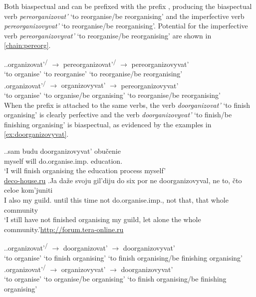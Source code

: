 Both biaspectual and  can be prefixed with the  prefix , producing the biaspectual verb \textit{pereorganizovat'} `to reorganise/be reorganising' and the imperfective verb \textit{pereorganizovyvat'} `to reorganise/be reorganising'. Potential  for the imperfective verb \textit{pereorganizovyvat'} `to reorganise/be reorganising' are shown in \ref{chain:pereorg}. 

\ex.\label{chain:pereorg}\ag.organizovat'\textsuperscript{\PF\slash\IPF} {$\rightarrow$} {pereorganizovat'\textsuperscript{\PF\slash\IPF}} {$\rightarrow$} pereorganizovyvat'\textsuperscript{\IPF}\\
{`to organise'} {} {`to reorganise'} {} {`to reorganise/be reorganising'}\\
\bg.organizovat'\textsuperscript{\PF\slash\IPF} {$\rightarrow$} {organizovyvat'\textsuperscript{\IPF}} {$\rightarrow$} pereorganizovyvat'\textsuperscript{\IPF}\\
{`to organise'} {} {`to organise/be organising'} {} {`to reorganise/be reorganising'}\\

When the  prefix  is attached to the same verbs, the verb \textit{doorganizovat'} `to finish organising' is clearly perfective and the verb \textit{doorganizovyvat'} `to finish/be finishing organising' is biaspectual, as evidenced by the examples in \ref{ex:doorganizovyvat}.

\ex.\label{ex:doorganizovyvat}\ag.sam budu doorganizovyvat'\textsuperscript{\IPF} obu\v{c}enie\\
myself will do.organise.imp. education.\\
\trans `I will finish organising the education process myself'\\\hbox{}\hfill\hbox{\url{deco-house.ru}}
\bg.Ja da\v{z}e svoju gil'diju do six por ne doorganizovyval\textsuperscript{\PF}, ne to, \v{c}to celoe kom'juniti\\
I also my guild. until this time not do.organise.imp., not that, that whole community\\
\trans `I still have not finished organising my guild, let alone the whole community.'\hbox{}\hfill\hbox{\url{http://forum.tera-online.ru}}

\ex.\label{chain:doorg}\ag.organizovat'\textsuperscript{\PF\slash\IPF} {$\rightarrow$} {doorganizovat'\textsuperscript{\PF}} {$\rightarrow$} doorganizovyvat'\textsuperscript{\IPF}\\
{`to organise'} {} {`to finish organising'} {} {`to finish organising/be finishing organising'}\\
\bg.organizovat'\textsuperscript{\PF\slash\IPF} {$\rightarrow$} {organizovyvat'\textsuperscript{\IPF}} {$\rightarrow$} doorganizovyvat'\textsuperscript{\PF}\\
{`to organise'} {} {`to organise/be organising'} {} {`to finish organising/be finishing organising'}\\

